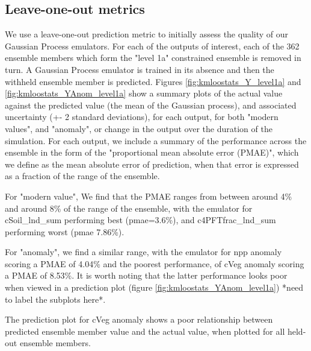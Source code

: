 \documentclass[gmd, manuscript]{copernicus}
\begin{document}
\subsection{Leave-one-out metrics}     %

We use a leave-one-out prediction metric to initially assess the quality of our Gaussian Process emulators. For each of the outputs of interest, each of the 362 ensemble members which form the "level 1a" constrained ensemble is removed in turn. A Gaussian Process emulator is trained in its absence and then the withheld ensemble member is predicted. Figures \ref{fig:kmloostats_Y_level1a} and \ref{fig:kmloostats_YAnom_level1a}  show a summary plots of the actual value against the predicted value (the mean of the Gaussian process), and associated uncertainty (+- 2 standard deviations), for each output, for both "modern values", and "anomaly", or change in the output over the duration of the simulation. For each output, we include a summary of the performance across the ensemble in the form of the "proportional mean absolute error (PMAE)", which we define as the mean absolute error of prediction, when that error is expressed as a fraction of the range of the ensemble.

For "modern value", We find that the PMAE ranges from between around 4\% and around 8\% of the range of the ensemble, with the emulator for cSoil\_lnd\_sum performing best (pmae=3.6\%), and c4PFTfrac\_lnd\_sum performing worst (pmae  7.86\%).

For "anomaly", we find a similar range, with the emulator for npp anomaly scoring a PMAE of 4.04\% and the poorest performance, of cVeg anomaly scoring a PMAE of 8.53\%. It is worth noting that the latter performance looks poor when viewed in a prediction plot (figure \ref{fig:kmloostats_YAnom_level1a}) *need to label the subplots here*.

The prediction plot for cVeg anomaly shows a poor relationship between predicted ensemble member value and the actual value, when plotted for all held-out ensemble members.
\end{document}
